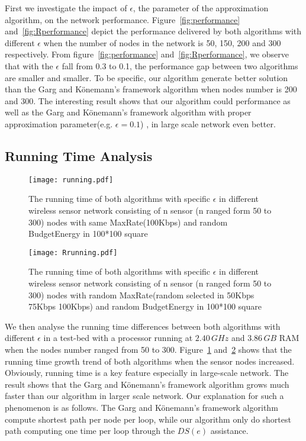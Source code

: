 \documentclass{article}
\begin{document}
First we investigate the impact of $\epsilon$, the parameter of the approximation algorithm, on the network performance. Figure~\ref{fig:performance} and~\ref{fig:Rperformance} depict the performance delivered by both algorithms with different $\epsilon$ when the number of nodes in the network is 50, 150, 200 and 300 respectively. From figure~\ref{fig:performance} and~\ref{fig:Rperformance}, we observe that with the $\epsilon$ fall from 0.3 to 0.1, the performance gap between two algorithms are smaller and smaller. To be specific, our algorithm generate better solution than the Garg and K\"{o}nemann's framework algorithm when nodes number is 200 and 300. The interesting result shows that our algorithm could performance as well as the Garg and K\"{o}nemann's framework algorithm with proper approximation parameter(e.g. $\epsilon = 0.1$) , in large scale network even better.

\subsection{Running Time Analysis}

\begin{figure}[htbp]
\centering
\texttt{[image: running.pdf]}
\caption{The running time of both algorithms with specific $\epsilon$ in different wireless sensor network consisting of n sensor (n ranged form 50 to 300) nodes with same MaxRate(100Kbps) and random BudgetEnergy in 100*100 square}
\label{fig:running}
\end{figure}

\begin{figure}[htbp]
\centering
\texttt{[image: Rrunning.pdf]}
\caption{The running time of both algorithms with specific $\epsilon$ in different wireless sensor network consisting of n sensor (n ranged form 50 to 300) nodes with random MaxRate(random selected in 50Kbps 75Kbps 100Kbps) and random BudgetEnergy in 100*100 square}
\label{fig:Rrunning}
\end{figure}

We then analyse the running time differences between both algorithms with different $\epsilon$ in a test-bed with a processor running at $2.40\,GHz$ and $3.86\,GB$ RAM when the nodes number ranged from 50 to 300.
Figure~\ref{fig:running} and~\ref{fig:Rrunning} shows that the running time growth trend of both algorithms when the sensor nodes increased. Obviously, running time is a key feature especially in large-scale network. The result shows that the Garg and K\"{o}nemann's framework algorithm
grows much faster than our algorithm in larger scale network. Our explanation for such a phenomenon is as follows. The Garg and K\"{o}nemann's framework algorithm compute shortest path per node per loop, while our algorithm only do shortest path computing one time per loop through the $DS(e)$ assistance.














\end{document}
